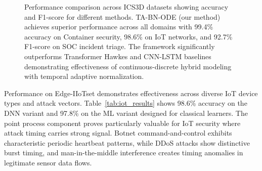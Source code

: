 \documentclass[10pt,journal,compsoc]{IEEEtran}
\begin{document}
\begin{figure}[!t]
\centering
{}
\vspace{-0.3cm}
\caption{Performance comparison across ICS3D datasets showing accuracy and F1-score for different methods. TA-BN-ODE (our method) achieves superior performance across all domains with 99.4\% accuracy on Container security, 98.6\% on IoT networks, and 92.7\% F1-score on SOC incident triage. The framework significantly outperforms Transformer Hawkes and CNN-LSTM baselines demonstrating effectiveness of continuous-discrete hybrid modeling with temporal adaptive normalization.}
\label{fig:performance}
\end{figure}



Performance on Edge-IIoTset demonstrates effectiveness across diverse IoT device types and attack vectors. Table~\ref{tab:iot_results} shows 98.6\% accuracy on the DNN variant and 97.8\% on the ML variant designed for classical learners. The point process component proves particularly valuable for IoT security where attack timing carries strong signal. Botnet command-and-control exhibits characteristic periodic heartbeat patterns, while DDoS attacks show distinctive burst timing, and man-in-the-middle interference creates timing anomalies in legitimate sensor data flows.
\end{document}
